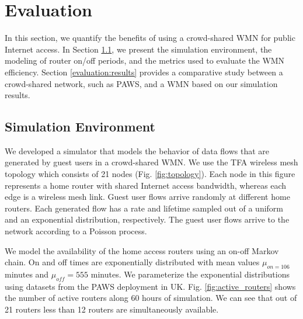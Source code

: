 \section{Evaluation}
\label{sec:evaluation}

In this section, we quantify the benefits of using a crowd-shared WMN for public Internet access. In Section \ref{evaluation:environment}, we present the simulation environment, the modeling of router on/off periods, and the metrics used to evaluate the WMN efficiency. Section \ref{evaluation:results} provides a comparative study between a crowd-shared network, such as PAWS, and a WMN based on our simulation results.

\subsection{Simulation Environment}
\label{evaluation:environment}


We developed a simulator that models the behavior of data flows that are generated by guest users in a crowd-shared WMN. We use the TFA wireless mesh topology \cite{TFA} which consists of 21 nodes (Fig. \ref{fig:topology}). Each node in this figure represents a home router with shared Internet access bandwidth, whereas each edge is a wireless mesh link. Guest user flows arrive randomly at different home routers. Each generated flow has a rate and lifetime sampled out of a uniform and an exponential distribution, respectively. The guest user flows arrive to the network according to a Poisson process.

We model the availability of the home access routers using an on-off Markov chain. On and off times are exponentially distributed with mean values $\mu_{on = 106}$ minutes and $\mu_{off} = 555$ minutes. We parameterize the exponential distributions using datasets from the PAWS deployment in UK. Fig. \ref{fig:active_routers} shows the number of active routers along 60 hours of simulation. We can see that out of 21 routers less than 12 routers are simultaneously available.

